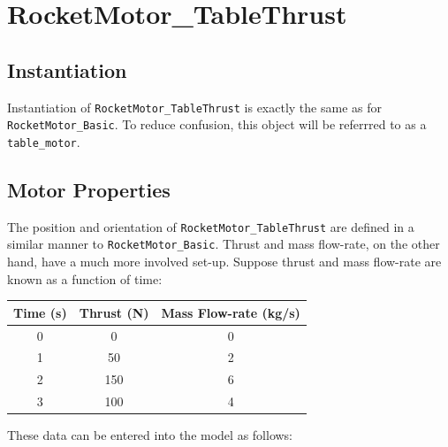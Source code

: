 \documentclass[11pt,fleqn]{report}
\begin{document}
\section{RocketMotor\_TableThrust}
\subsection{Instantiation}
\par Instantiation of \verb|RocketMotor_TableThrust| is exactly the same as for \verb|RocketMotor_Basic|.  To reduce confusion, this object will be referrred to as a \verb|table_motor|.

\subsection{Motor Properties}
\par The position and orientation of \verb|RocketMotor_TableThrust| are defined in a similar manner to \verb|RocketMotor_Basic|. Thrust and mass flow-rate, on the other hand, have a much more involved set-up. Suppose thrust and mass flow-rate are known as a function of time:

\begin{center}
\begin{tabular}{|c|c|c|}
\hline
\textbf{Time (s)} & \textbf{Thrust (N)} & \textbf{Mass Flow-rate (kg/s)} \\
\hline
0 & 0 & 0 \\
1 & 50 & 2 \\
2 & 150 & 6 \\
3 & 100 & 4 \\
\hline
\end{tabular}
\end{center}

These data can be entered into the model as follows:

\end{document}
